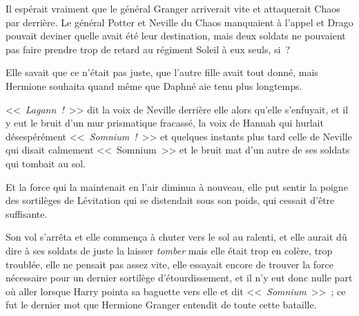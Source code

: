 Il espérait vraiment que le général Granger arriverait vite et attaquerait Chaos par derrière. Le général Potter et Neville du Chaos manquaient à l'appel et Drago pouvait deviner quelle avait été leur destination, mais deux soldats ne pouvaient pas faire prendre trop de retard au régiment Soleil à eux seuls, si~?

\later

Elle savait que ce n'était pas juste, que l'autre fille avait tout donné, mais Hermione souhaita quand même que Daphné aie tenu plus longtemps.

<<~\emph{Lagann~!}~>> dit la voix de Neville derrière elle alors qu'elle s'enfuyait, et il y eut le bruit d'un mur prismatique fracassé, la voix de Hannah qui hurlait désespérément <<~\emph{Somnium~!}~>> et quelques instants plus tard celle de Neville qui disait calmement <<~Somnium~>> et le bruit mat d'un autre de ses soldats qui tombait au sol.

Et la force qui la maintenait en l'air diminua à nouveau, elle put sentir la poigne des sortilèges de Lévitation qui se distendait sous son poids, qui cessait d'être suffisante.

Son vol s'arrêta et elle commença à chuter vers le sol au ralenti, et elle aurait dû dire à ses soldats de juste la laisser \emph{tomber} mais elle était trop en colère, trop troublée, elle ne pensait pas assez vite, elle essayait encore de trouver la force nécessaire pour un dernier sortilège d'étourdissement, et il n'y eut donc nulle part où aller lorsque Harry pointa sa baguette vers elle et dit <<~\emph{Somnium}~>>~; ce fut le dernier mot que Hermione Granger entendit de toute cette bataille.
